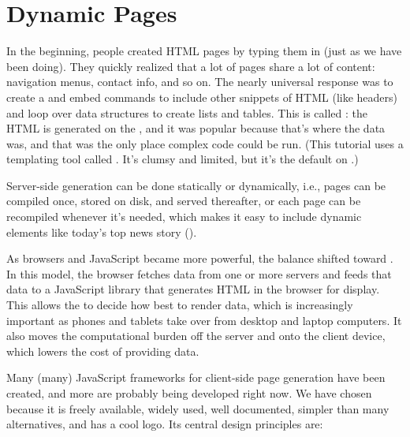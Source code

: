 \chapter{Dynamic Pages}\label{s:dynamic}

In the beginning,
people created HTML pages by typing them in (just as we have been doing).
They quickly realized that a lot of pages share a lot of content:
navigation menus, contact info, and so on.
The nearly universal response was to create a 
and embed commands to include other snippets of HTML (like headers)
and loop over data structures to create lists and tables.
This is called :
the HTML is generated on the ,
and it was popular because that's where the data was,
and that was the only place complex code could be run.
(This tutorial uses a templating tool called .
It's clumsy and limited, but it's the default on .)

Server-side generation can be done statically or dynamically,
i.e.,
pages can be compiled once, stored on disk, and served thereafter,
or each page can be recompiled whenever it's needed,
which makes it easy to include dynamic elements like today's top news story
().


As browsers and JavaScript became more powerful,
the balance shifted toward .
In this model,
the browser fetches data from one or more servers
and feeds that data to a JavaScript library that generates HTML in the browser for display.
This allows the  to decide how best to render data,
which is increasingly important as phones and tablets take over
from desktop and laptop computers.
It also moves the computational burden off the server
and onto the client device,
which lowers the cost of providing data.

Many (many) JavaScript frameworks for client-side page generation have been created,
and more are probably being developed right now.
We have chosen  because it is freely available,
widely used,
well documented,
simpler than many alternatives,
and has a cool logo.
Its central design principles are:

